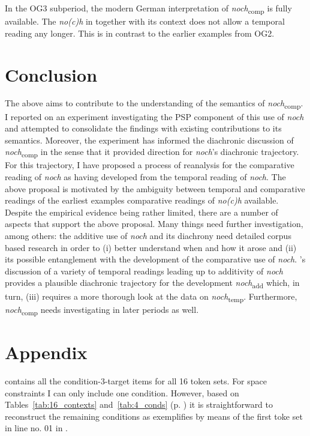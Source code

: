 \documentclass[output=paper]{langsci/langscibook}
\begin{document}
In the OG3 subperiod, the modern German interpretation of \textit{noch}\textsubscript{comp} is fully available. The \textit{no(c)h} in  together with its context does not allow a temporal reading any longer. This is in contrast to the earlier examples from OG2.

\section{Conclusion}

The above aims to contribute to the understanding of the semantics of \textit{noch}\textsubscript{comp}. I reported on an experiment investigating the PSP component of this use of \textit{noch} and attempted to consolidate the findings with existing contributions to its semantics. Moreover, the experiment has informed the diachronic discussion of \textit{noch}\textsubscript{comp} in the sense that it provided direction for \textit{noch}'s diachronic trajectory. For this trajectory, I have proposed a process of reanalysis for the comparative reading of \textit{noch} as having developed from the temporal reading of \textit{noch}. The above proposal is motivated by the ambiguity between temporal and comparative readings of the earliest examples comparative readings of \textit{no(c)h} available. Despite the empirical evidence being rather limited, there are a number of aspects that support the above proposal. Many things need further investigation, among others: the additive use of \textit{noch} and its diachrony need detailed corpus based research in order to (i) better understand when and how it arose and (ii) its possible entanglement with the development of the comparative use of \textit{noch}. \citeauthor{beck2016a_sub}'s \citeyearpar{beck2016a_sub} discussion of a variety of temporal readings leading up to additivity of \textit{noch} provides a plausible diachronic trajectory for the development \textit{noch}\textsubscript{add} which, in turn, (iii) requires a more thorough look at the data on \textit{noch}\textsubscript{temp}. Furthermore, \textit{noch}\textsubscript{comp} needs investigating in later periods as well.


{\sloppy\printbibliography[heading=subbibliography,notkeyword=this]}



\section*{Appendix}
 contains all the condition-3-target items for all 16 token sets. For space constraints I can only include one condition. However, based on Tables~\ref{tab:16_contexts} and~\ref{tab:4_conds} (p. \pageref{tab:4_conds}) it is straightforward to reconstruct the remaining conditions as  exemplifies by means of the first toke set in line no. 01 in .
\end{document}
